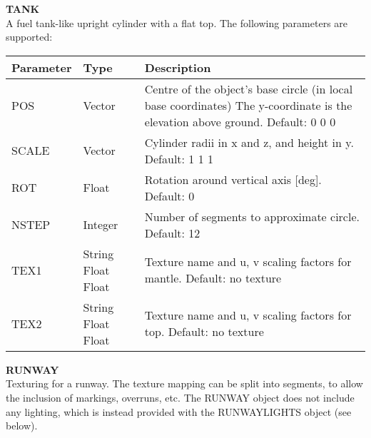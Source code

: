 \documentclass[Orbiter Developer Manual.tex]{subfiles}
\begin{document}
\noindent
\textbf{TANK}\\
A fuel tank-like upright cylinder with a flat top. The following parameters are supported:

	\begin{longtable}{ |p{}|p{}|p{}| }
	\hline\rule{0pt}{2ex}
	\textbf{Parameter} & \textbf{Type} & \textbf{Description}\\
	\hline\rule{0pt}{2ex}
	POS & Vector & Centre of the object's base circle (in local base coordinates) The y-coordinate is the elevation above ground. Default: 0 0 0\\
	\hline\rule{0pt}{2ex}
	SCALE & Vector & Cylinder radii in x and z, and height in y. Default: 1 1 1\\
	\hline\rule{0pt}{2ex}
	ROT & Float & Rotation around vertical axis [deg]. Default: 0\\
	\hline\rule{0pt}{2ex}
	NSTEP & Integer & Number of segments to approximate circle. Default: 12\\
	\hline\rule{0pt}{2ex}
	TEX1 & String Float Float & Texture name and u, v scaling factors for mantle. Default: no texture\\
	\hline\rule{0pt}{2ex}
	TEX2 & String Float Float & Texture name and u, v scaling factors for top. Default: no texture\\
	\hline
	\end{longtable}

\noindent
\textbf{RUNWAY}\\
Texturing for a runway. The texture mapping can be split into segments, to allow the inclusion of markings, overruns, etc. The RUNWAY object does not include any lighting, which is instead provided with the RUNWAYLIGHTS object (see below).
\end{document}
